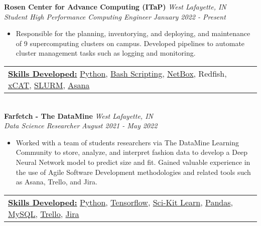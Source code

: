 \documentclass[a4paper]{article}
\begin{document}
\textbf{Rosen Center for Advance Computing (ITaP)} \hfill \textit {West Lafayette, IN}\\
\textit{Student High Performance Computing Engineer} \hfill \textit {January 2022 - Present}\\
\vspace{-1mm}
\begin{itemize} \itemsep 1pt
	\item Responsible for the planning, inventorying, and deploying, and maintenance of 9 supercomputing clusters on campus.
    Developed pipelines to automate cluster management tasks such as logging and monitoring. 
\end{itemize}
\begin{tabular}{ l l }
    \underline{\textbf {Skills Developed:}} \href{https://www.python.org/}{Python}, \href{https://www.gnu.org/software/bash/}{Bash Scripting}, \href{https://docs.netbox.dev/en/stable/}{NetBox}, Redfish, \href{https://xcat.org/}{xCAT}, \href{https://slurm.schedmd.com/overview.html}{SLURM}, \href{https://asana.com/}{Asana} 
\end{tabular} \\ 
\vspace{2mm}
\textbf{Farfetch - The DataMine} \hfill \textit {West Lafayette, IN}\\
\textit{Data Science Researcher} \hfill \textit {August 2021 - May 2022}\\
\vspace{-1mm}
\begin{itemize} \itemsep 1pt
	\item Worked with a team of students researchers via The DataMine Learning Community to store, analyze, and interpret fashion data to develop a Deep Neural Network model to predict size and fit.
    Gained valuable experience in the use of Agile Software Development methodologies and related tools such as Asana, Trello, and Jira.
\end{itemize}
\vspace{-1mm}
\begin{tabular}{ l l }
    \underline{\textbf {Skills Developed:}} \href{https://www.python.org/}{Python}, \href{https://www.tensorflow.org/}{Tensorflow}, \href{https://scikit-learn.org/stable/index.html}{Sci-Kit Learn}, \href{https://pandas.pydata.org/}{Pandas}, \href{https://www.mysql.com/}{MySQL}, \href{https://trello.com/}{Trello}, \href{https://jira.atlassian.com/}{Jira}
\end{tabular} \\ 
\vspace{2mm}
\end{document}
